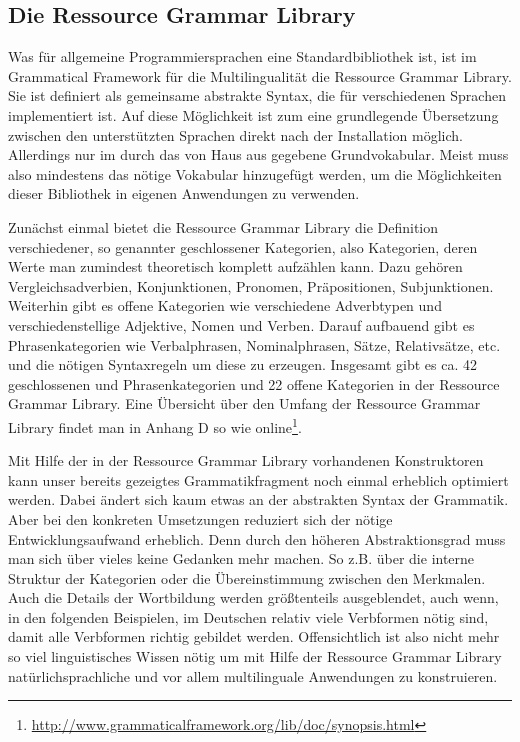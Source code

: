 \documentclass[fontsize=12pt,abstract=on,titlepage,bibliography=totoc,ngerman,listof=totoc]{scrreprt}
\begin{document}
\subsection{Die Ressource Grammar Library}
\label{subsec:rgl}
Was für allgemeine Programmiersprachen eine Standardbibliothek ist, ist im Grammatical Framework für die Multilingualität die Ressource Grammar Library. Sie ist definiert als gemeinsame abstrakte Syntax, die für verschiedenen Sprachen implementiert ist. Auf diese Möglichkeit ist zum eine grundlegende Übersetzung zwischen den unterstützten Sprachen direkt nach der Installation möglich. Allerdings nur im durch das von Haus aus gegebene Grundvokabular. Meist muss also mindestens das nötige Vokabular hinzugefügt werden, um die Möglichkeiten dieser Bibliothek in eigenen Anwendungen zu verwenden. \par
Zunächst einmal bietet die Ressource Grammar Library die Definition verschiedener, so genannter geschlossener Kategorien, also Kategorien, deren Werte man zumindest theoretisch komplett aufzählen kann. Dazu gehören Vergleichsadverbien, Konjunktionen, Pronomen, Präpositionen, Subjunktionen. Weiterhin gibt es offene Kategorien wie verschiedene Adverbtypen und verschiedenstellige Adjektive, Nomen und Verben. Darauf aufbauend gibt es Phrasenkategorien wie Verbalphrasen, Nominalphrasen, Sätze, Relativsätze, etc. und die nötigen Syntaxregeln um diese zu erzeugen. Insgesamt gibt es ca. 42 geschlossenen und Phrasenkategorien und 22 offene Kategorien in der Ressource Grammar Library. Eine Übersicht über den Umfang der Ressource Grammar Library findet man in \cite{RANTA2011} Anhang D so wie online\footnote{\url{http://www.grammaticalframework.org/lib/doc/synopsis.html}}. \par
Mit Hilfe der in der Ressource Grammar Library vorhandenen Konstruktoren kann unser bereits gezeigtes Grammatikfragment noch einmal erheblich optimiert werden. Dabei ändert sich kaum etwas an der abstrakten Syntax der Grammatik. Aber bei den konkreten Umsetzungen reduziert sich der nötige Entwicklungsaufwand erheblich. Denn durch den höheren Abstraktionsgrad muss man sich über vieles keine Gedanken mehr machen. So z.B. über die interne Struktur der Kategorien oder die Übereinstimmung zwischen den Merkmalen. Auch die Details der Wortbildung werden größtenteils ausgeblendet, auch wenn, in den folgenden Beispielen, im Deutschen relativ viele Verbformen nötig sind, damit alle Verbformen richtig gebildet werden. Offensichtlich ist also nicht mehr so viel linguistisches Wissen nötig um mit Hilfe der Ressource Grammar Library natürlichsprachliche und vor allem multilinguale Anwendungen zu konstruieren. \par
\end{document}
